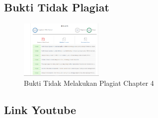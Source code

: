 \subsection{Bukti Tidak Plagiat}
\begin{figure}[H]
\centering
	\includegraphics[width=4cm]{figures/1174070/4/buktiplagiat/1.PNG}
	\caption{Bukti Tidak Melakukan Plagiat Chapter 4}
\end{figure}

\subsection{Link Youtube}


